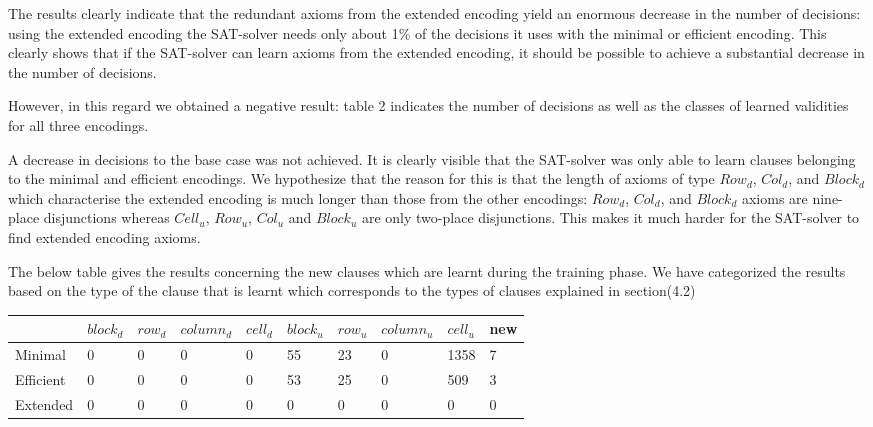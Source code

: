\documentclass{article}
\begin{document}
The results clearly indicate that the redundant axioms from the extended encoding yield an enormous decrease in the number of decisions: using the extended encoding the SAT-solver needs only about 1\% of the decisions it uses with the minimal or efficient encoding. This clearly shows that if the SAT-solver can learn axioms from the extended encoding, it should be possible to achieve a substantial decrease in the number of decisions.

However, in this regard we obtained a negative result: table 2 indicates the number of decisions as well as the classes of learned validities for all three encodings. %

A decrease in decisions to the base case was not achieved. It is clearly visible that the SAT-solver was only able to learn clauses belonging to the minimal and efficient encodings. We hypothesize that the reason for this is that the length of axioms of type $Row_d$, $Col_d$, and $Block_d$ which characterise the extended encoding is much longer than those from the other encodings: $Row_d$, $Col_d$, and $Block_d$ axioms are nine-place disjunctions whereas $Cell_u$, $Row_u$, $Col_u$ and $Block_u$ are only two-place disjunctions. This makes it much harder for the SAT-solver to find extended encoding axioms.


\bigskip

The below table gives the results concerning the new clauses which are learnt during the training phase. We have categorized the results based on the type of the clause that is learnt which corresponds to the types of clauses explained in section(4.2)

\begin{center}
 \label{tab:title} 
\begin{tabular}{ | l | l | l | l | l | l | l | l | l | l |}
	\hline
     & $block_{d}$ & $row_{d}$ & $column_{d}$ & $cell_{d}$ & $block_{u}$ & $row_{u}$ & $column_{u}$ & $cell_{u}$ & new \\ \hline
    Minimal & 0 & 0 & 0 & 0 & 55 & 23 & 0 & 1358  & 7 \\ \hline
    Efficient & 0 & 0 & 0 & 0 & 53 & 25 & 0 & 509  & 3  \\ \hline
    Extended & 0 & 0 & 0 & 0 & 0 & 0 & 0 & 0 & 0 \\
    \hline
\end{tabular}
\end{center}
\bigskip
\end{document}
